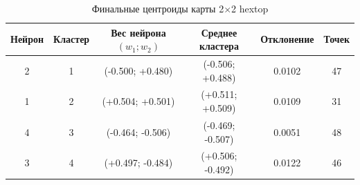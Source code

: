 \begin{table}[H]
\caption{Финальные центроиды карты 2$\times$2 hextop}
\label{tab:centroids}
\centering
\small
\begin{tabular}{cccccc}
\toprule
Нейрон & Кластер & Вес нейрона $(w_1; w_2)$ & Среднее кластера & Отклонение & Точек \\
\midrule
2 & 1 & (-0.500; +0.480) & (-0.506; +0.488) & 0.0102 & 47 \\
1 & 2 & (+0.504; +0.501) & (+0.511; +0.509) & 0.0109 & 31 \\
4 & 3 & (-0.464; -0.506) & (-0.469; -0.507) & 0.0051 & 48 \\
3 & 4 & (+0.497; -0.484) & (+0.506; -0.492) & 0.0122 & 46 \\
\bottomrule
\end{tabular}
\end{table}
